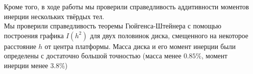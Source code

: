 \documentclass[a4paper,12pt]{article}
\begin{document}
	Кроме того, в ходе работы мы проверили справедливость аддитивности моментов инерции нескольких твёрдых тел.\\
	
	Мы проверили справедливость теоремы Гюйгенса-Штейнера с помощью построения графика $I(h^2)$ для двух половинок диска, смещенного на некоторое расстояние $h$ от центра платформы. Масса диска и его момент инерции были определены с достаточно большой точностью (масса менее $0.85\%$, момент инерции менее $3.8\%$)
\end{document}
